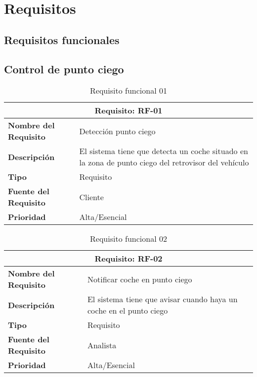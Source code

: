 \documentclass[10pt,a4paper,oldfontcommands]{dpds}
\begin{document}
\pagecolor{fondo}
\color{principal}


\section{Requisitos}
\subsection{Requisitos funcionales}
\subsection{Control de punto ciego}
\begin{table}[h]
\begin{center}
\begin{tabular}{p{} p{7cm}}
\multicolumn{2}{c}{\textbf{Requisito: RF-01} } \\
\hline \hline
\textbf{Nombre del Requisito} & Detección punto ciego  \\
\textbf{Descripción} & El sistema tiene que detecta un coche situado en la zona de punto ciego del retrovisor del vehículo  \\
\textbf{Tipo} & Requisito  \\
\textbf{Fuente del Requisito} & Cliente  \\
\textbf{Prioridad} & Alta/Esencial  \\ \hline
\end{tabular}
\caption{Requisito funcional 01}
\label{tab:personal}
\end{center}
\end{table}

\begin{table}[h]
\begin{center}
\begin{tabular}{p{} p{7cm}}
\multicolumn{2}{c}{\textbf{Requisito: RF-02} } \\
\hline \hline
\textbf{Nombre del Requisito} & Notificar coche en punto ciego  \\
\textbf{Descripción} & El sistema tiene que avisar cuando haya un coche en el punto ciego \\
\textbf{Tipo} & Requisito  \\
\textbf{Fuente del Requisito} & Analista  \\
\textbf{Prioridad} & Alta/Esencial  \\ \hline
\end{tabular}
\caption{Requisito funcional 02}
\label{tab:personal}
\end{center}
\end{table}
\end{document}
